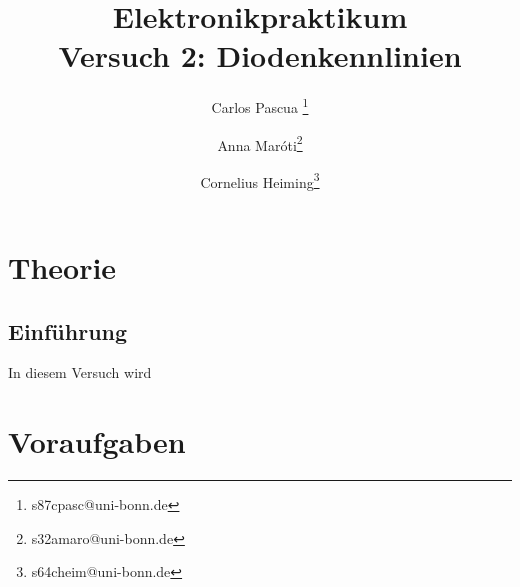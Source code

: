 \documentclass{article}
\begin{document}
    \title{Elektronikpraktikum \\ \textbf{Versuch 2: Diodenkennlinien}}
    \author[1]{Carlos Pascua \thanks{s87cpasc@uni-bonn.de}}
    \author[1]{Anna Maróti\thanks{s32amaro@uni-bonn.de}}
    \author[1]{Cornelius Heiming\thanks{s64cheim@uni-bonn.de}}
    \begin{titlepage}
     \maketitle   
    \end{titlepage}
        
\tableofcontents
\newpage
{}

\pagestyle{fancy}
\fancyhead[R]{\thepage}
\fancyhead[L]{\leftmark}

\section{Theorie}

\subsection*{Einführung}

In diesem Versuch wird 
\section{Voraufgaben}
\end{document}
